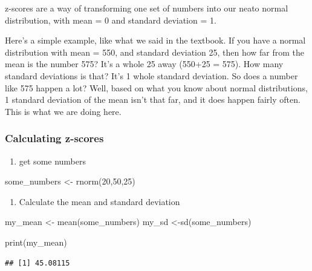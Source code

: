 \documentclass[
]{book}
\newenvironment{Shaded}{\begin{snugshade}}{\end{snugshade}}
\newcommand{\DecValTok}[1]{\textcolor[rgb]{0.00,0.00,0.81}{#1}}
\newcommand{\FunctionTok}[1]{\textcolor[rgb]{0.00,0.00,0.00}{#1}}
\newcommand{\NormalTok}[1]{#1}
\newcommand{\OtherTok}[1]{\textcolor[rgb]{0.56,0.35,0.01}{#1}}
\providecommand{\tightlist}{%
  \setlength{\itemsep}{0pt}\setlength{\parskip}{0pt}}
\begin{document}
z-scores are a way of transforming one set of numbers into our neato normal distribution, with mean = 0 and standard deviation = 1.

Here's a simple example, like what we said in the textbook. If you have a normal distribution with mean = 550, and standard deviation 25, then how far from the mean is the number 575? It's a whole 25 away (550+25 = 575). How many standard deviations is that? It's 1 whole standard deviation. So does a number like 575 happen a lot? Well, based on what you know about normal distributions, 1 standard deviation of the mean isn't that far, and it does happen fairly often. This is what we are doing here.

\hypertarget{calculating-z-scores}{%
\subsubsection{Calculating z-scores}\label{calculating-z-scores}}

\begin{enumerate}
\def\labelenumi{\arabic{enumi}.}
\tightlist
\item
  get some numbers
\end{enumerate}

\begin{Shaded}
\begin{Highlighting}[]
\NormalTok{some\_numbers }\OtherTok{\textless{}{-}} \FunctionTok{rnorm}\NormalTok{(}\DecValTok{20}\NormalTok{,}\DecValTok{50}\NormalTok{,}\DecValTok{25}\NormalTok{)}
\end{Highlighting}
\end{Shaded}

\begin{enumerate}
\def\labelenumi{\arabic{enumi}.}
\setcounter{enumi}{1}
\tightlist
\item
  Calculate the mean and standard deviation
\end{enumerate}

\begin{Shaded}
\begin{Highlighting}[]
\NormalTok{my\_mean }\OtherTok{\textless{}{-}} \FunctionTok{mean}\NormalTok{(some\_numbers)}
\NormalTok{my\_sd }\OtherTok{\textless{}{-}}\FunctionTok{sd}\NormalTok{(some\_numbers)}

\FunctionTok{print}\NormalTok{(my\_mean)}
\end{Highlighting}
\end{Shaded}

\begin{verbatim}
## [1] 45.08115
\end{verbatim}
\end{document}
